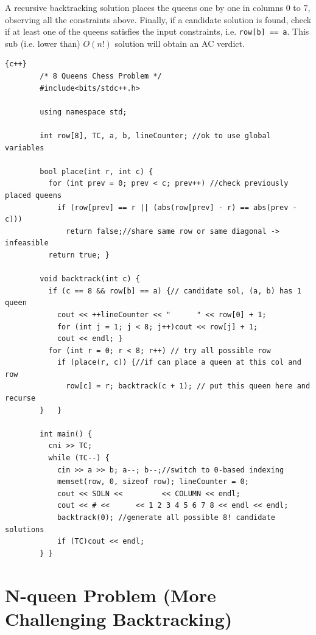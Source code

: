 \hspace{7mm}A recursive backtracking solution places the queens one by one in columns 0 to 7, observing all the constraints above. Finally, if a candidate solution is found, check if at least one of the queens satisfies the input constraints, i.e. \lstinline|row[b] == a|. This sub (i.e. lower than) $O(n!)$ solution will obtain an AC verdict.
\\

\begin{lstlisting}{c++}
        /* 8 Queens Chess Problem */
        #include<bits/stdc++.h>
        
        using namespace std;
        
        int row[8], TC, a, b, lineCounter; //ok to use global variables
        
        bool place(int r, int c) {
          for (int prev = 0; prev < c; prev++) //check previously placed queens
            if (row[prev] == r || (abs(row[prev] - r) == abs(prev - c)))
              return false;//share same row or same diagonal -> infeasible
          return true; }
        
        void backtrack(int c) {
          if (c == 8 && row[b] == a) {// candidate sol, (a, b) has 1 queen
            cout << ++lineCounter << "      " << row[0] + 1;
            for (int j = 1; j < 8; j++)cout << row[j] + 1;
            cout << endl; }
          for (int r = 0; r < 8; r++) // try all possible row
            if (place(r, c)) {//if can place a queen at this col and row
              row[c] = r; backtrack(c + 1); // put this queen here and recurse
        }   }
        
        int main() {
          cni >> TC;
          while (TC--) {
            cin >> a >> b; a--; b--;//switch to 0-based indexing
            memset(row, 0, sizeof row); lineCounter = 0;
            cout << SOLN <<         << COLUMN << endl;
            cout << # <<      << 1 2 3 4 5 6 7 8 << endl << endl;
            backtrack(0); //generate all possible 8! candidate solutions
            if (TC)cout << endl;
        } }   

\end{lstlisting}

\clearpage


\section{N-queen Problem (More Challenging Backtracking)}
\label{n-Queen}

